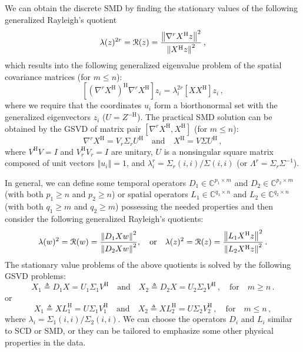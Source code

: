 \documentclass[10pt]{article}
\newcommand{\norm}[1]{\left\Vert#1\right\Vert}
\begin{document}
We can obtain the discrete SMD by finding the stationary values of the following generalized Rayleigh's quotient
\begin{equation}
    \lambda(z)^{2r}={\cal R}(z) = \frac{\norm{\nabla^{r} X^\mathrm{H} z}^2}{\norm{X^\mathrm{H}z}^2}\,,
\end{equation}
which results into the following generalized eigenvalue problem of the spatial covariance matrices (for $m \le n$):
\begin{equation}
     \left[\left(\nabla^{r} X^\mathrm{H}\right)^\mathrm{H}\nabla^{r} X^\mathrm{H}\right] z_i=\lambda_{i}^{2r}\left[XX^\mathrm{H}\right] z_i\,,
\end{equation}
where we require that the coordinates $u_i$ form a biorthonormal set with the generalized eigenvectors $z_i$ ($U=Z^\mathrm{-H}$).
The practical SMD solution can be obtained by the GSVD of matrix pair $\left[\nabla^{r} X^\mathrm{H}, X^\mathrm{H}\right]$ (for $m\le n$):
\begin{equation}
     \nabla^{r} X^\mathrm{H} = V_r\Sigma_r U^\mathrm{H} \quad \mathrm{and}\quad X^\mathrm{H} = V \Sigma U^\mathrm{H}\,,
\end{equation}
where $V^\mathrm{H}V = I$ and $V_r^\mathrm{H} V_r =I$ are unitary, $U$ is a nonsingular square matrix composed of unit vectors $\norm{u_i} = 1$, and $\lambda_{i}^r = \Sigma_r(i,i)/\Sigma(i,i)$ (or $\Lambda^r=\Sigma_r\Sigma^{-1}$).

In general, we can define some temporal operators $D_1\in \mathbb{C}^{p_1\times m}$ and $D_2\in \mathbb{C}^{p_2\times m}$ (with both $p_1 \ge n$ and $p_2\ge n$) or spatial operators $L_1\in \mathbb{C}^{q_1\times n}$ and $L_2\in \mathbb{C}^{q_2\times n}$ (with both $q_1\ge m$ and $q_2\ge m$) possessing the needed properties and then consider the following generalized Rayleigh's quotients:
\begin{equation}
    \lambda(w)^2={\cal R}(w) = \frac{\norm{D_1 Xw}^2}{\norm{D_2 Xw}^2},\quad \mathrm{or}\quad \lambda(z)^{2}={\cal R}(z) = \frac{\norm{L_1 X^\mathrm{H}z}^2}{\norm{L_2 X^\mathrm{H} z}^2}\,.
\end{equation}
The stationary value problems of the above quotients is solved by the following GSVD problems:
\begin{equation}
    X_1 \triangleq D_1 X = U_1\Sigma_{1} V^\mathrm{H} \quad \mathrm{and}\quad X_2 \triangleq D_2 X = U_2\Sigma_{2} V^\mathrm{H}\,, \quad \mathrm{for} \quad m\ge n\,.
\end{equation}
or
\begin{equation}
    X_1 \triangleq X L_1^\mathrm{H} = U \Sigma_{1} V_1^\mathrm{H} \quad \mathrm{and}\quad X_2 \triangleq X L_2^\mathrm{H} = U \Sigma_{2} V_2^\mathrm{H}\,, \quad \mathrm{for} \quad m\le n\,,
\end{equation}
where $\lambda_{i} = \Sigma_{1}(i,i)/\Sigma_{2}(i,i)$.
We can choose the operators $D_i$ and $L_i$ similar to SCD or SMD, or they can be tailored to emphasize some other physical properties in the data.
\end{document}
